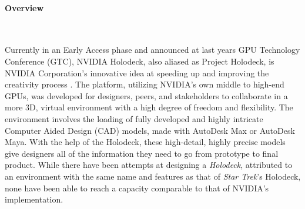 \documentclass[11pt]{article}
\begin{document}
\paragraph{Overview} ~ \par 
Currently in an Early Access phase and announced at last years GPU Technology Conference (GTC), NVIDIA Holodeck, also aliased as Project Holodeck, is NVIDIA Corporation's innovative idea at speeding up and improving the creativity process \cite{nvidianews}. The platform, utilizing NVIDIA's own middle to high-end GPUs, was developed for designers, peers, and stakeholders to collaborate in a more 3D, virtual environment \cite{nvidiamain} with a high degree of freedom and flexibility. The environment involves the loading of fully developed and highly intricate Computer Aided Design (CAD) models, made with AutoDesk Max or AutoDesk Maya. With the help of the Holodeck, these high-detail, highly precise models give designers all of the information they need to go from prototype to final product. While there have been attempts at designing a \emph{Holodeck}, attributed to an environment with the same name and features as that of \emph{Star Trek}'s Holodeck, none have been able to reach a capacity comparable to that of NVIDIA's implementation.
\end{document}
